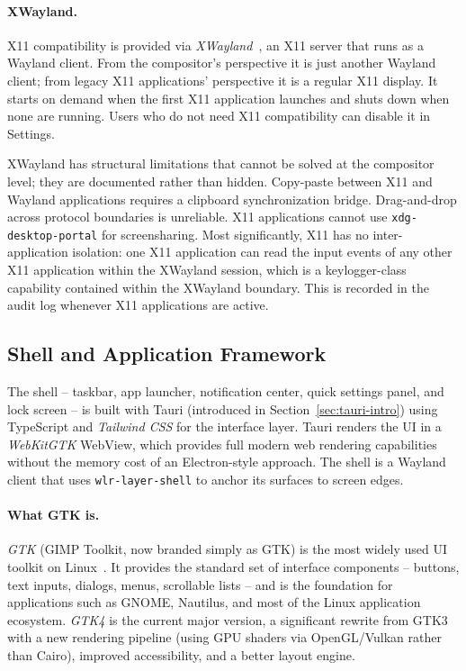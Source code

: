 \paragraph{XWayland.}
X11 compatibility is provided via \emph{XWayland}~\cite{archwiki:xwayland},
an X11 server that runs as a Wayland client. From the compositor's perspective
it is just another Wayland client; from legacy X11 applications' perspective it
is a regular X11 display. It starts on demand when the first X11 application
launches and shuts down when none are running. Users who do not need X11
compatibility can disable it in Settings.

XWayland has structural limitations that cannot be solved at the compositor
level; they are documented rather than hidden. Copy-paste between X11 and
Wayland applications requires a clipboard synchronization bridge.
Drag-and-drop across protocol boundaries is unreliable. X11 applications cannot
use \texttt{xdg-desktop-portal} for screensharing. Most significantly, X11 has
no inter-application isolation: one X11 application can read the input events
of any other X11 application within the XWayland session, which is a
keylogger-class capability contained within the XWayland boundary. This is
recorded in the audit log whenever X11 applications are active.

\subsection{Shell and Application Framework}
\label{sec:shell}

The shell -- taskbar, app launcher, notification center, quick settings panel,
and lock screen -- is built with Tauri (introduced in
Section~\ref{sec:tauri-intro}) using TypeScript and \emph{Tailwind CSS} for the
interface layer. Tauri renders the UI in a \emph{WebKitGTK} WebView, which
provides full modern web rendering capabilities without the memory cost of an
Electron-style approach. The shell is a Wayland client that uses
\texttt{wlr-layer-shell} to anchor its surfaces to screen edges.

\paragraph{What GTK is.}
\emph{GTK} (GIMP Toolkit, now branded simply as GTK) is the most widely used
UI toolkit on Linux~\cite{gtk}. It provides the standard set of interface
components -- buttons, text inputs, dialogs, menus, scrollable lists -- and is
the foundation for applications such as GNOME, Nautilus, and most of the Linux
application ecosystem. \emph{GTK4} is the current major version, a significant
rewrite from GTK3 with a new rendering pipeline (using GPU shaders via
OpenGL/Vulkan rather than Cairo), improved accessibility, and a better layout
engine.

